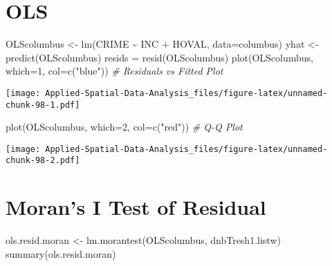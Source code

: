 \documentclass[
]{book}
\newenvironment{Shaded}{\begin{snugshade}}{\end{snugshade}}
\newcommand{\AttributeTok}[1]{\textcolor[rgb]{0.77,0.63,0.00}{#1}}
\newcommand{\CommentTok}[1]{\textcolor[rgb]{0.56,0.35,0.01}{\textit{#1}}}
\newcommand{\DecValTok}[1]{\textcolor[rgb]{0.00,0.00,0.81}{#1}}
\newcommand{\FunctionTok}[1]{\textcolor[rgb]{0.00,0.00,0.00}{#1}}
\newcommand{\NormalTok}[1]{#1}
\newcommand{\OtherTok}[1]{\textcolor[rgb]{0.56,0.35,0.01}{#1}}
\newcommand{\SpecialCharTok}[1]{\textcolor[rgb]{0.00,0.00,0.00}{#1}}
\newcommand{\StringTok}[1]{\textcolor[rgb]{0.31,0.60,0.02}{#1}}
\begin{document}
\hypertarget{ols}{%
\section{OLS}\label{ols}}

\begin{Shaded}
\begin{Highlighting}[]
\NormalTok{OLScolumbus }\OtherTok{\textless{}{-}} \FunctionTok{lm}\NormalTok{(CRIME }\SpecialCharTok{\textasciitilde{}}\NormalTok{ INC }\SpecialCharTok{+}\NormalTok{ HOVAL, }\AttributeTok{data=}\NormalTok{columbus)}
\NormalTok{yhat }\OtherTok{\textless{}{-}} \FunctionTok{predict}\NormalTok{(OLScolumbus)}
\NormalTok{resids }\OtherTok{=} \FunctionTok{resid}\NormalTok{(OLScolumbus)}
\FunctionTok{plot}\NormalTok{(OLScolumbus, }\AttributeTok{which=}\DecValTok{1}\NormalTok{, }\AttributeTok{col=}\FunctionTok{c}\NormalTok{(}\StringTok{"blue"}\NormalTok{)) }\CommentTok{\# Residuals vs Fitted Plot}
\end{Highlighting}
\end{Shaded}

\texttt{[image: Applied-Spatial-Data-Analysis\_files/figure-latex/unnamed-chunk-98-1.pdf]}

\begin{Shaded}
\begin{Highlighting}[]
\FunctionTok{plot}\NormalTok{(OLScolumbus, }\AttributeTok{which=}\DecValTok{2}\NormalTok{, }\AttributeTok{col=}\FunctionTok{c}\NormalTok{(}\StringTok{"red"}\NormalTok{))  }\CommentTok{\# Q{-}Q Plot}
\end{Highlighting}
\end{Shaded}

\texttt{[image: Applied-Spatial-Data-Analysis\_files/figure-latex/unnamed-chunk-98-2.pdf]}

\hypertarget{morans-i-test-of-residual}{%
\section{Moran's I Test of Residual}\label{morans-i-test-of-residual}}

\begin{Shaded}
\begin{Highlighting}[]
\NormalTok{ols.resid.moran }\OtherTok{\textless{}{-}} \FunctionTok{lm.morantest}\NormalTok{(OLScolumbus, dnbTresh1.listw)}
\FunctionTok{summary}\NormalTok{(ols.resid.moran)}
\end{Highlighting}
\end{Shaded}
\end{document}
